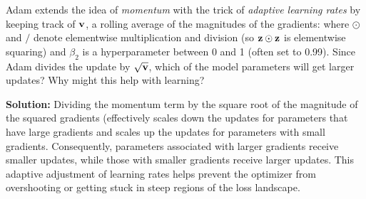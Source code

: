 \begin{parts}
\begin{subparts}
            \subpart[2] Adam extends the idea of {\it momentum} with the trick of {\it adaptive learning rates} by keeping track of  $\mathbf{v}$, a rolling average of the magnitudes of the gradients:
                where $\odot$ and $/$ denote elementwise multiplication and division (so $\mathbf{z} \odot \mathbf{z}$ is elementwise squaring) and $\beta_2$ is a hyperparameter between 0 and 1 (often set to  0.99). Since Adam divides the update by $\sqrt{\mathbf{v}}$, which of the model parameters will get larger updates?  Why might this help with learning? \newline

                {\color{red} \textbf{Solution:} \newline
                    Dividing the momentum term by the square root of the magnitude of the squared gradients (effectively scales down the updates for parameters that have large gradients and scales up the updates for parameters with small gradients. Consequently, parameters associated with larger gradients receive smaller updates, while those with smaller gradients receive larger updates. This adaptive adjustment of learning rates helps prevent the optimizer from overshooting or getting stuck in steep regions of the loss landscape. \newline
                }
                
                \end{subparts}
        
        

\end{parts}
